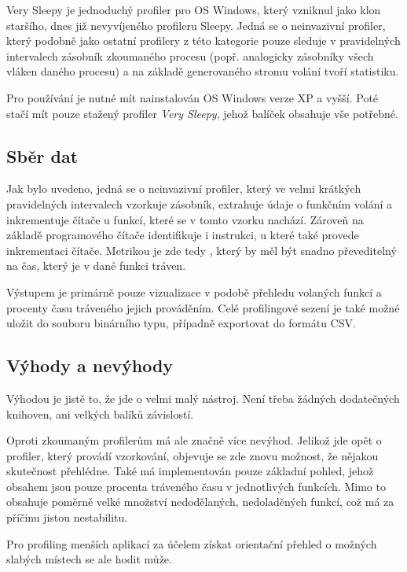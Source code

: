 \documentclass[czech,BP]{thesiskiv}
\begin{document}
Very Sleepy je jednoduchý profiler pro OS Windows, který vzniknul jako klon staršího, dnes již nevyvíjeného profileru Sleepy. Jedná se o neinvazivní profiler, který podobně jako ostatní profilery z této kategorie pouze sleduje v pravidelných intervalech zásobník zkoumaného procesu (popř. analogicky zásobníky všech vláken daného procesu) a na základě generovaného stromu volání tvoří statistiku.

Pro používání je nutné mít nainstalován OS Windows verze XP a vyšší. Poté stačí mít pouze stažený profiler \emph{Very Sleepy}, jehož balíček obsahuje vše potřebné.

\subsection*{Sběr dat}

Jak bylo uvedeno, jedná se o neinvazivní profiler, který ve velmi krátkých pravidelných intervalech vzorkuje zásobník, extrahuje údaje o funkčním volání a inkrementuje čítače u funkcí, které se v tomto vzorku nachází. Zároveň na základě programového čítače identifikuje i instrukci, u které také provede inkrementaci čítače. Metrikou je zde tedy , který by měl být snadno převeditelný na čas, který je v dané funkci tráven.

Výstupem je primárně pouze vizualizace v podobě přehledu volaných funkcí a procenty času tráveného jejich prováděním. Celé profilingové sezení je také možné uložit do souboru binárního typu, případně exportovat do formátu CSV.

\subsection*{Výhody a nevýhody}

Výhodou je jistě to, že jde o velmi malý nástroj. Není třeba žádných dodatečných knihoven, ani velkých balíků závislostí.

Oproti zkoumaným profilerům má ale značně více nevýhod. Jelikož jde opět o profiler, který provádí vzorkování, objevuje se zde znovu možnost, že nějakou skutečnost přehlédne. Také má implementován pouze základní pohled, jehož obsahem jsou pouze procenta tráveného času v jednotlivých funkcích. Mimo to obsahuje poměrně velké množství nedodělaných, nedoladěných funkcí, což má za příčinu jistou nestabilitu.

Pro profiling menších aplikací za účelem získat orientační přehled o možných slabých místech se ale hodit může.
\end{document}
